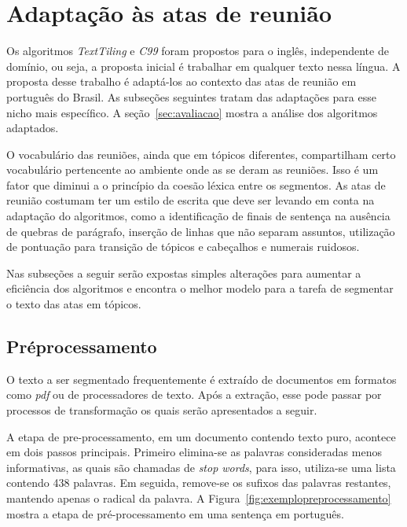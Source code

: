 \section{Adaptação às atas de reunião}
	\label{sec:adaptacaoasatas}



	Os algoritmos \textit{TextTiling} e \textit{C99} foram propostos para o inglês, independente de domínio, ou seja, a proposta inicial é trabalhar em qualquer texto nessa língua.
	A proposta desse trabalho é adaptá-los ao contexto das atas de reunião em português do Brasil. As subseções seguintes tratam das adaptações para esse nicho mais específico. A seção~\ref{sec:avaliacao} mostra a análise dos algoritmos adaptados.

O vocabulário das reuniões, ainda que em tópicos diferentes, compartilham certo vocabulário pertencente ao ambiente onde as se deram as reuniões. Isso é um fator que diminui a o princípio da coesão léxica entre os segmentos.
As atas de reunião costumam ter um estilo de escrita que deve ser levando em conta na adaptação do algoritmos, como a identificação de finais de sentença na ausência de quebras de parágrafo, inserção de linhas que não separam assuntos, utilização de pontuação para transição de tópicos e cabeçalhos e numerais ruidosos. 

Nas subseções a seguir serão expostas simples alterações para aumentar a eficiência dos algoritmos e encontra o melhor modelo para a tarefa de segmentar o texto das atas em tópicos.


\subsection{Préprocessamento}
	\label{subsec:preprocessamento}




	O texto a ser segmentado frequentemente é extraído de documentos em formatos como \textit{pdf} ou de processadores de texto. Após a extração, esse pode passar por processos de transformação os quais serão apresentados a seguir.

	A etapa de pre-processamento, em um documento contendo texto puro, acontece em dois passos principais. Primeiro elimina-se as palavras consideradas menos informativas, as quais são chamadas de \textit{stop words}, para isso, utiliza-se uma lista contendo 438 palavras. Em seguida, remove-se os sufixos das palavras restantes, mantendo apenas o radical da palavra. A Figura~\ref{fig:exemplopreprocessamento} mostra a etapa de pré-processamento em uma sentença em português.
	



